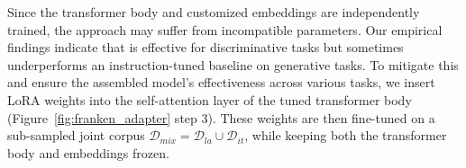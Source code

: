 Since the transformer body and customized embeddings are independently trained, the \ouradapter approach may suffer from incompatible parameters. Our empirical findings indicate that \ouradapter is effective for discriminative tasks but sometimes underperforms an instruction-tuned baseline on generative tasks. To mitigate this and ensure the assembled model's effectiveness across various tasks, we insert LoRA weights into the self-attention layer of the tuned transformer body (Figure~\ref{fig:franken_adapter} step 3). These weights are then fine-tuned on a sub-sampled joint corpus $\mathcal{D}_{mix}=\mathcal{D}_{la}\cup\mathcal{D}_{it}$, while keeping both the transformer body and embeddings frozen.


